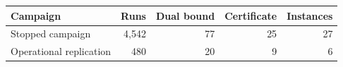 \begin{tabular}{lrrrr}
\toprule
Campaign & Runs & Dual bound & Certificate & Instances \\
\midrule
Stopped campaign & 4,542 & 77 & 25 & 27 \\
Operational replication & 480 & 20 & 9 & 6 \\
\bottomrule
\end{tabular}
